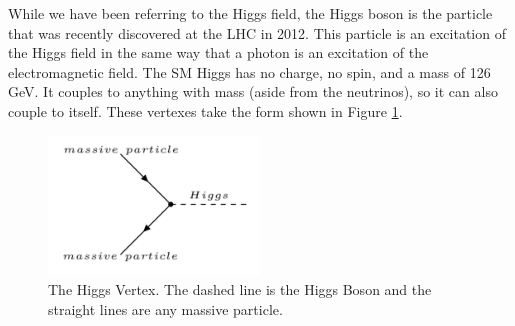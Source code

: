 While we have been referring to the Higgs field, the Higgs boson is the particle that was recently discovered at the LHC in 2012. This particle is an excitation of the Higgs field in the same way that a photon is an excitation of the electromagnetic field. The SM Higgs has no charge, no spin, and a mass of 126 GeV. It couples to anything with mass (aside from the neutrinos), so it can also couple to itself. These vertexes take the form shown in Figure \ref{Fig:Intro:Vertex4}.
\begin{figure}[h]
    \centering
        \includegraphics[width=0.5\textwidth]{F1/Vertex4}
        \caption{The Higgs Vertex. The dashed line is the Higgs Boson and the straight lines are any massive particle.}
        \label{Fig:Intro:Vertex4}
\end{figure}

